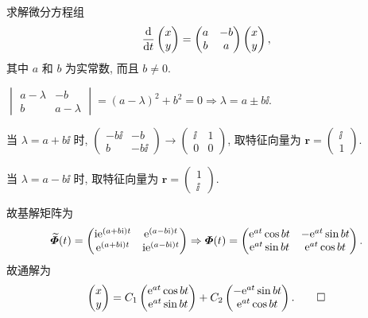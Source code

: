 \begin{exercise}
  求解微分方程组
  \[\frac{\mathop{}\!\mathrm{d}}{\mathop{}\!\mathrm{d} t}\begin{pmatrix}x\\y\end{pmatrix}
    = \begin{pmatrix}a&-b\\b&a\end{pmatrix}\begin{pmatrix}x\\y\end{pmatrix},\]
  其中 $a$ 和 $b$ 为实常数, 而且 $b\neq 0$.
\end{exercise}

\begin{solve}
  $\begin{vmatrix}a-\lambda&-b\\b&a-\lambda\end{vmatrix}=(a-\lambda)^2+b^2=0\Rightarrow\lambda=a\pm b\ii$.

  当 $\lambda=a+b\ii$ 时, 
  $\begin{pmatrix}-b\ii&-b\\b&-b\ii\end{pmatrix}\to\begin{pmatrix}\ii&1\\0&0\end{pmatrix}$, 
  取特征向量为 $\bm{r}=\begin{pmatrix}\ii\\1\end{pmatrix}$.

  当 $\lambda=a-b\ii$ 时, 取特征向量为 $\bm{r}=\begin{pmatrix}1\\\ii\end{pmatrix}$.

  故基解矩阵为
  \[\widetilde{\bm{\varPhi}}(t) = 
    \begin{pmatrix}\mathrm{i}\mathrm{e}^{(a+b\mathrm{i})t}&\mathrm{e}^{(a-b\mathrm{i})t}\\\mathrm{e}^{(a+b\mathrm{i})t}&\mathrm{i}\mathrm{e}^{(a-b\mathrm{i})t}\end{pmatrix}
    \Rightarrow\bm{\varPhi}(t) =
    \begin{pmatrix}\mathrm{e}^{at}\cos bt&-\mathrm{e}^{at}\sin bt\\ \mathrm{e}^{at}\sin bt&\mathrm{e}^{at}\cos bt\end{pmatrix}.\]
  故通解为
  \[\begin{pmatrix}x\\y\end{pmatrix} =
    C_1\begin{pmatrix}\mathrm{e}^{at}\cos bt\\\mathrm{e}^{at}\sin bt\end{pmatrix}
    + C_2\begin{pmatrix}-\mathrm{e}^{at}\sin bt\\\mathrm{e}^{at}\cos bt\end{pmatrix}.\qedhere\]
\end{solve}



